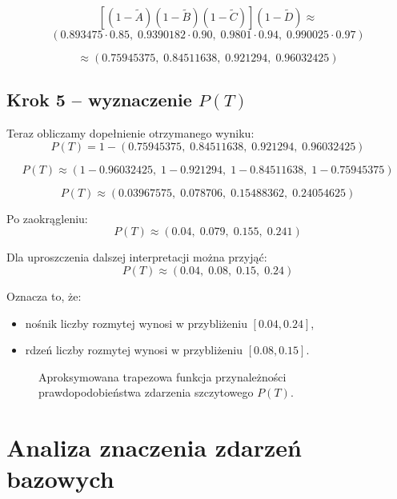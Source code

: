 \documentclass[11pt,a4paper]{article}
\begin{document}
\[
[(1-\tilde{A})(1-\tilde{B})(1-\tilde{C})](1-\tilde{D}) \approx
\]
\[
(0.893475\cdot0.85,\;0.9390182\cdot0.90,\;0.9801\cdot0.94,\;0.990025\cdot0.97)
\]

\[
\approx
(0.75945375,\;0.84511638,\;0.921294,\;0.96032425)
\]

\subsection{Krok 5 -- wyznaczenie $P(T)$}

Teraz obliczamy dopełnienie otrzymanego wyniku:
\[
P(T)=1-(0.75945375,\;0.84511638,\;0.921294,\;0.96032425)
\]

\[
P(T)\approx
(1-0.96032425,\;1-0.921294,\;1-0.84511638,\;1-0.75945375)
\]

\[
P(T)\approx
(0.03967575,\;0.078706,\;0.15488362,\;0.24054625)
\]

Po zaokrągleniu:
\[
P(T)\approx(0.04,\;0.079,\;0.155,\;0.241)
\]

Dla uproszczenia dalszej interpretacji można przyjąć:
\[
P(T)\approx(0.04,\;0.08,\;0.15,\;0.24)
\]

Oznacza to, że:
\begin{itemize}
\item nośnik liczby rozmytej wynosi w przybliżeniu $[0.04,0.24]$,
\item rdzeń liczby rozmytej wynosi w przybliżeniu $[0.08,0.15]$.
\end{itemize}

\begin{figure}[H]
\centering
{}
\caption{Aproksymowana trapezowa funkcja przynależności prawdopodobieństwa zdarzenia szczytowego $P(T)$.}
\label{fig:pt-trapezoid}
\end{figure}

\section{Analiza znaczenia zdarzeń bazowych}
\end{document}
